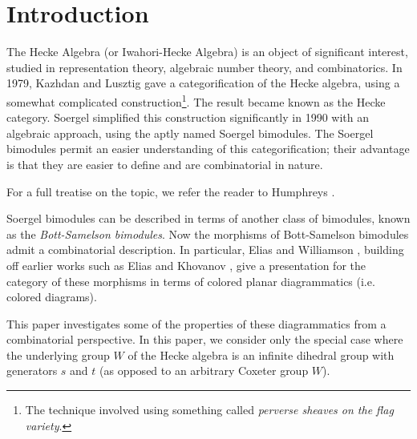 
\section{Introduction}

The Hecke Algebra (or Iwahori-Hecke Algebra) is an object of significant interest, studied in representation theory, algebraic number theory, and combinatorics.  In 1979, Kazhdan and Lusztig \cite{ref:KaLu1,ref:KaLu2} gave a categorification of the Hecke algebra, using a somewhat complicated construction\footnote{The technique involved using something called \emph{perverse sheaves on the flag variety}.}.  The result became known as the Hecke category.
Soergel \cite{ref:Soe1,ref:Soe2} simplified this construction significantly in 1990 with an algebraic approach, using the aptly named Soergel bimodules.  The Soergel bimodules permit an easier understanding of this categorification; their advantage is that they are easier to define and are combinatorial in nature.

For a full treatise on the topic, we refer the reader to Humphreys \cite{ref:Humphreys}.

Soergel bimodules can be described in terms of another class of bimodules, known as the \emph{Bott-Samelson bimodules}.
Now the morphisms of Bott-Samelson bimodules admit a combinatorial description.  In particular, Elias and Williamson \cite{ref:gr4all}, building off earlier works such as Elias and Khovanov \cite{ref:EKh}, give a presentation for the category of these morphisms in terms of colored planar diagrammatics (i.e. colored diagrams). 

This paper investigates some of the properties of these diagrammatics from a combinatorial perspective.   In this paper, we consider only the special case where the underlying group $W$ of the Hecke algebra is an infinite dihedral group with generators $s$ and $t$ (as opposed to an arbitrary Coxeter group $W$).

